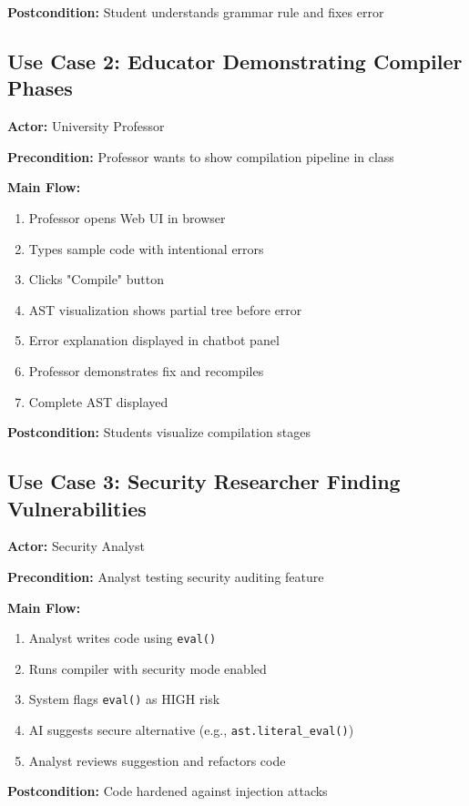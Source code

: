\documentclass[a4paper,11pt]{article}
\begin{document}
\textbf{Postcondition:} Student understands grammar rule and fixes error

\subsection{Use Case 2: Educator Demonstrating Compiler Phases}

\textbf{Actor:} University Professor

\textbf{Precondition:} Professor wants to show compilation pipeline in class

\textbf{Main Flow:}
\begin{enumerate}
    \item Professor opens Web UI in browser
    \item Types sample code with intentional errors
    \item Clicks "Compile" button
    \item AST visualization shows partial tree before error
    \item Error explanation displayed in chatbot panel
    \item Professor demonstrates fix and recompiles
    \item Complete AST displayed
\end{enumerate}

\textbf{Postcondition:} Students visualize compilation stages

\subsection{Use Case 3: Security Researcher Finding Vulnerabilities}

\textbf{Actor:} Security Analyst

\textbf{Precondition:} Analyst testing security auditing feature

\textbf{Main Flow:}
\begin{enumerate}
    \item Analyst writes code using \texttt{eval()}
    \item Runs compiler with security mode enabled
    \item System flags \texttt{eval()} as HIGH risk
    \item AI suggests secure alternative (e.g., \texttt{ast.literal\_eval()})
    \item Analyst reviews suggestion and refactors code
\end{enumerate}

\textbf{Postcondition:} Code hardened against injection attacks
\end{document}
